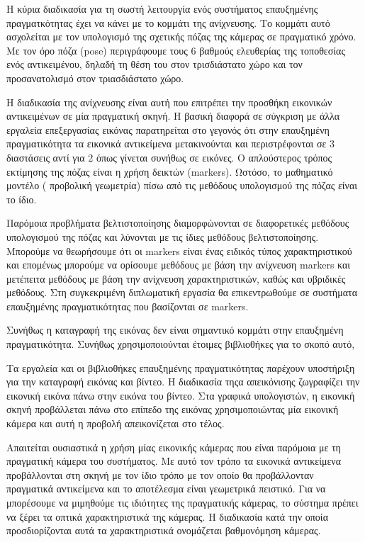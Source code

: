 Η κύρια διαδικασία για τη σωστή λειτουργία ενός συστήματος επαυξημένης πραγματκότητας έχει να κάνει με το κομμάτι της ανίχνευσης. Το κομμάτι αυτό ασχολείται με τον υπολογισμό της σχετικής πόζας της κάμερας σε πραγματικό χρόνο. Με τον όρο πόζα (pose) περιγράφουμε τους 6 βαθμούς ελευθερίας της τοποθεσίας ενός αντικειμένου, δηλαδή τη θέση του στον τρισδιάστατο χώρο και τον προσανατολισμό στον τριασδιάστατο χώρο.

Η διαδικασία της ανίχνευσης είναι αυτή που επιτρέπει την προσθήκη εικονικών αντικειμένων σε μία πραγματική σκηνή.
Η βασική διαφορά σε σύγκριση με άλλα εργαλεία επεξεργασίας εικόνας παρατηρείται στο γεγονός ότι στην επαυξημένη πραγματικότητα τα εικονικά αντικείμενα μετακινούνται και περιστρέφονται σε 3 διαστάσεις αντί για 2 όπως γίνεται συνήθως σε εικόνες.  Ο απλούστερος τρόπος εκτίμησης της πόζας είναι η χρήση δεικτών (markers). 
Ωστόσο, το μαθηματικό μοντέλο ( προβολική γεωμετρία) πίσω από τις μεθόδους υπολογισμού της πόζας είναι το ίδιο. 

Παρόμοια προβλήματα βελτιστοποίησης διαμορφώνονται σε διαφορετικές μεθόδους υπολογισμού της πόζας και λύνονται με τις ίδιες μεθόδους βελτιστοποίησης.  
Μπορούμε να θεωρήσουμε ότι οι markers είναι ένας ειδικός τύπος χαρακτηριστικού και επομένως μπορούμε να ορίσουμε μεθόδους με βάση την ανίχνευση markers και μετέπειτα μεθόδους με βάση την ανίχνευση χαρακτηριστικών, καθώς και υβριδικές μεθόδους. Στη συγκεκριμένη διπλωματική εργασία θα επικεντρωθούμε σε συστήματα επαυξημένης πραγματικότητας που βασίζονται σε markers.

Συνήθως η καταγραφή της εικόνας δεν είναι σημαντικό κομμάτι στην επαυξημένη πραγματικότητα. Συνήθως χρησιμοποιούνται έτοιμες βιβλιοθήκες για το σκοπό αυτό,

Τα εργαλεία και οι βιβλιοθήκες επαυξημένης πραγματικότητας παρέχουν υποστήριξη για την καταγραφή εικόνας και βίντεο. Η διαδικασία τηςα απεικόνισης ζωγραφίζει την εικονική εικόνα πάνω στην εικόνα του βίντεο. Στα γραφικά υπολογιστών, η εικονική σκηνή προβάλλεται πάνω στο επίπεδο της εικόνας χρησιμοποιώντας μία εικονική κάμερα και αυτή η προβολή απεικονίζεται στο τέλος. 

Απαιτείται ουσιαστικά η χρήση μίας εικονικής κάμερας που είναι παρόμοια με τη πραγματική κάμερα του συστήματος. Με αυτό τον τρόπο τα εικονικά αντικείμενα προβάλλονται στη σκηνή με τον ίδιο τρόπο με τον οποίο θα προβάλλονταν πραγματικά αντικείμενα και το αποτέλεσμα είναι γεωμετρικά πειστικό. Για να μπορέσουμε να μιμηθούμε τις ιδιότητες της πραγματικής κάμερας, το σύστημα πρέπει να ξέρει τα οπτικά χαρακτηριστικά της κάμερας. Η διαδικασία κατά την οποία προσδιορίζονται αυτά τα χαρακτηριστικά ονομάζεται βαθμονόμηση κάμερας.

